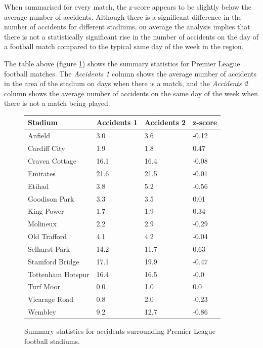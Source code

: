 \documentclass[12pt]{article}
\begin{document}
When summarised for every match, the z-score appears to be slightly below the average number of accidents. Although there is a significant difference in the number of accidents for different stadiums, on average the analysis implies that there is not a statistically significant rise in the number of accidents on the day of a football match compared to the typical same day of the week in the region.

The table above (figure \ref{football}) shows the summary statistics for Premier League football matches. The \textit{Accidents 1} column shows the average number of accidents in the area of the stadium on days when there is a match, and the \textit{Accidents 2} column shows the average number of accidents on the same day of the week when there is not a match being played.


\begin{figure}
    \centering
    \begin{tabular}{|l|l|l|l|}
    \hline
        Stadium & Accidents 1 & Accidents 2 & z-score \\ \hline
        Anfield & 3.0 & 3.6 & -0.12 \\ \hline
        Cardiff City & 1.9 & 1.8 & 0.47 \\ \hline
        Craven Cottage & 16.1 & 16.4 & -0.08 \\ \hline
        Emirates & 21.6 & 21.5 & -0.01 \\ \hline
        Etihad & 3.8 & 5.2 & -0.56 \\ \hline
        Goodison Park & 3.3 & 3.5 & 0.01 \\ \hline
        King Power & 1.7 & 1.9 & 0.34 \\ \hline
        Molineux & 2.2 & 2.9 & -0.29 \\ \hline
        Old Trafford & 4.1 & 4.2 & -0.04 \\ \hline
        Selhurst Park & 14.2 & 11.7 & 0.63 \\ \hline
        Stamford Bridge & 17.1 & 19.9 & -0.47 \\ \hline
        Tottenham Hotspur & 16.4 & 16.5 & -0.0 \\ \hline
        Turf Moor & 0.0 & 1.0 & 0.0 \\ \hline
        Vicarage Road & 0.8 & 2.0 & -0.23 \\ \hline
        Wembley & 9.2 & 12.7 & -0.86 \\ \hline
    \end{tabular}
    \caption{Summary statistics for accidents surrounding Premier League football stadiums.}
    \label{football}
\end{figure}
\end{document}
